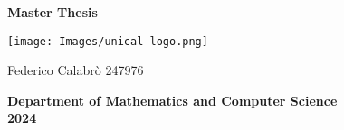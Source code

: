 \documentclass[../Thesis.tex]{subfiles}
\begin{document}
\vspace*{\fill}
\begin{center}
    \large\textbf{Master Thesis}
    
    \vspace{1.5cm}
    \texttt{[image: Images/unical-logo.png]}
    \vspace{1cm}
    
    \large Federico Calabrò 247976
    
    \vspace{2cm}
    
    \large\textbf{Department of Mathematics and Computer Science \\ 2024}
\end{center}
\vspace*{\fill}
\end{document}
